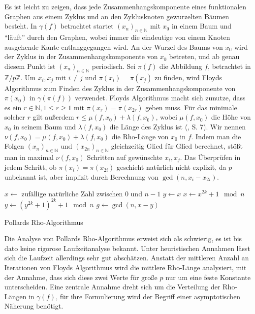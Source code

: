 \documentclass[a4paper, 10pt, ngerman]{article}
\newcommand{\N}{\mathbb{N}}
\newcommand{\Z}{\mathbb{Z}}
\begin{document}
\noindent Es ist leicht zu zeigen, dass jede Zusammenhangskomponente eines funktionalen Graphen aus einem Zyklus und an den Zyklusknoten gewurzelten Bäumen besteht. In $\gamma(f)$ betrachtet startet $(x_n)_{n \in \N}$ mit $x_0$ in einem Baum und "`läuft"' durch den Graphen, wobei immer die eindeutige von einem Knoten ausgehende Kante entlanggegangen wird. An der Wurzel des Baums von $x_0$ wird der Zyklus in der Zusammenhangskomponente von $x_0$ betreten, und ab genau diesem Punkt ist $(x_n)_{n \in \N}$ periodisch. Sei $\pi(f)$ die Abbildung $f$, betrachtet in $\Z/p\Z$. Um $x_i, x_j$ mit $i \ne j$ und $\pi(x_i) = \pi(x_j)$ zu finden, wird Floyds Algorithmus zum Finden des Zyklus in der Zusammenhangskomponente von $\pi(x_0)$ in $\gamma(\pi(f))$ verwendet. Floyds Algorithmus macht sich zunutze, dass es ein $r \in \N, 1 \le r \ge 1$ mit $\pi(x_r) = \pi(x_{2r})$ geben muss. Für das minimale solcher $r$ gilt außerdem $r \le \mu(f, x_0) + \lambda(f, x_0)$, wobei $\mu(f, x_0)$ die Höhe von $x_0$ in seinem Baum und $\lambda(f, x_0)$ die Länge des Zyklus ist (\cite{knu98}, S. 7). Wir nennen $\nu(f, x_0) = \mu(f, x_0) + \lambda(f, x_0)$ die Rho-Länge von $x_0$ in $f$. Indem man die Folgen $(x_n)_{n \in \N}$ und $(x_{2n})_{n \in \N}$ gleichzeitig Glied für Glied berechnet, stößt man in maximal $\nu(f, x_0)$ Schritten auf gewünschte $x_i, x_j$. Das Überprüfen in jedem Schritt, ob $\pi(x_i) = \pi(x_{2i})$ geschieht natürlich nicht explizit, da $p$ unbekannt ist, aber implizit durch Berechnung von $\gcd(n, x_i - x_{2i})$.

\begin{algorithm*}
    $x \gets $ zufällige natürliche Zahl zwischen $0$ und $n - 1$ \;
    $y \gets x$ \;
    {
        $x \gets x^{2k} + 1 \mod n$ \;
        $y \gets (y^{2k} + 1)^{2k} + 1 \mod n$ \;
        $g \gets \gcd(n, x - y)$ \;
        {
             \;
        }
    }

    \caption{Pollards Rho-Algorithmus}
\end{algorithm*}

\noindent Die Analyse von Pollards Rho-Algorithmus erweist sich als schwierig, es ist bis dato keine rigorose Laufzeitanalyse bekannt. Unter heuristischen Annahmen lässt sich die Laufzeit allerdings sehr gut abschätzen. Anstatt der mittleren Anzahl an Iterationen von Floyds Algorithmus wird die mittlere Rho-Länge analysiert, mit der Annahme, dass sich diese zwei Werte für große $p$ nur um eine feste Konstante unterscheiden. Eine zentrale Annahme dreht sich um die Verteilung der Rho-Längen in $\gamma(f)$, für ihre Formulierung wird der Begriff einer asymptotischen Näherung benötigt.
\end{document}
